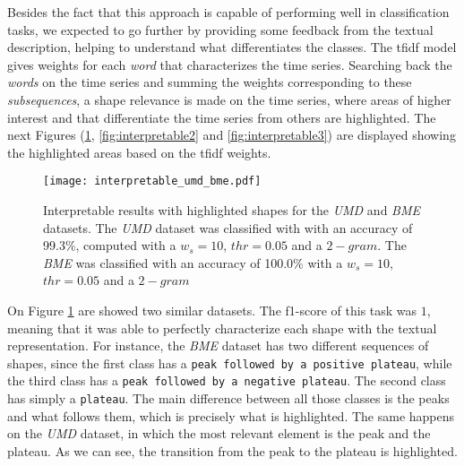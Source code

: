 Besides the fact that this approach is capable of performing well in classification tasks, we expected to go further by providing some feedback from the textual description, helping to understand what differentiates the classes. The \gls{tfidf} model gives weights for each \textit{word} that characterizes the time series. Searching back the \textit{words} on the time series and summing the weights corresponding to these \textit{subsequences}, a shape relevance is made on the time series, where areas of higher interest and that differentiate the time series from others are highlighted. The next Figures (\ref{fig:interpretable1}, \ref{fig:interpretable2} and \ref{fig:interpretable3}) are displayed showing the highlighted areas based on the \gls{tfidf} weights.

\begin{figure}[h]
    \centering
    \texttt{[image: interpretable\_umd\_bme.pdf]}
    \caption{Interpretable results with highlighted shapes for the \textit{UMD} and \textit{BME} datasets. The \textit{UMD} dataset was classified with with an accuracy of 99.3\%, computed with a $w_s=10$, $thr=0.05$ and a $2-gram$. The \textit{BME} was classified with an accuracy of 100.0\% with a $w_s=10$, $thr=0.05$ and a $2-gram$}
    \label{fig:interpretable1}
\end{figure}

On Figure \ref{fig:interpretable1} are showed two similar datasets. The f1-score of this task was $1$, meaning that it was able to perfectly characterize each shape with the textual representation. For instance, the \textit{BME} dataset has two different sequences of shapes, since the first class has a \texttt{peak followed by a positive plateau}, while the third class has a \texttt{peak followed by a negative plateau}. The second class has simply a \texttt{plateau}. The main difference between all those classes is the peaks and what follows them, which is precisely what is highlighted. The same happens on the \textit{UMD} dataset, in which the most relevant element is the peak and the plateau. As we can see, the transition from the peak to the plateau is highlighted.

